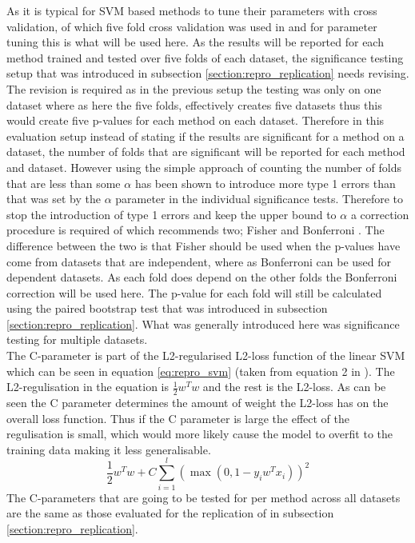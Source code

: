 As it is typical for SVM based methods to tune their parameters with cross validation, of which five fold cross validation was used in \citet{repro_vo_2015} and \citet{repro_wang_2017} for parameter tuning this is what will be used here. As the results will be reported for each method trained and tested over five folds of each dataset, the significance testing setup that was introduced in subsection \ref{section:repro_replication} needs revising. The revision is required as in the previous setup the testing was only on one dataset where as here the five folds, effectively creates five datasets thus this would create five p-values for each method on each dataset. Therefore in this evaluation setup instead of stating if the results are significant for a method on a dataset, the number of folds that are significant will be reported for each method and dataset. However using the simple approach of counting the number of folds that are less than some $\alpha$ has been shown to introduce more type 1 errors \citep{repro_dror_2017} than that was set by the $\alpha$ parameter in the individual significance tests. Therefore to stop the introduction of type 1 errors and keep the upper bound to $\alpha$ a correction procedure is required of which \citet{repro_dror_2018} recommends two; Fisher and Bonferroni \citep{repro_benjamini_2008}. The difference between the two is that Fisher should be used when the p-values have come from datasets that are independent, where as Bonferroni can be used for dependent datasets. As each fold does depend on the other folds the Bonferroni correction will be used here. The p-value for each fold will still be calculated using the paired bootstrap test that was introduced in subsection \ref{section:repro_replication}. What was generally introduced here was significance testing for multiple datasets.\\

The C-parameter is part of the L2-regularised L2-loss function of the linear SVM which can be seen in equation \ref{eq:repro_svm} (taken from equation 2 in \citep{repro_fan_2008}). The L2-regulisation in the equation is $\frac{1}{2}w^Tw$ and the rest is the L2-loss. As can be seen the C parameter determines the amount of weight the L2-loss has on the overall loss function. Thus if the C parameter is large the effect of the regulisation is small, which would more likely cause the model to overfit to the training data making it less generalisable.
\begin{equation}
    \frac{1}{2}w^{T}w + C\sum_{i=1}^{l}(\max(0, 1 - y_{i}w^{T}x_i))^2
    \label{eq:repro_svm}
\end{equation}
The C-parameters that are going to be tested for per method across all datasets are the same as those evaluated for the replication of \citet{repro_wang_2017} in subsection \ref{section:repro_replication}. 

